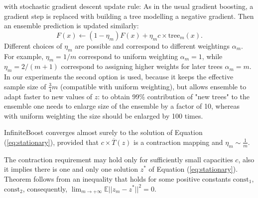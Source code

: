 with stochastic gradient descent update rule:
As in the usual gradient boosting, a gradient step is replaced with building a tree modelling a negative gradient.
Then an ensemble prediction is updated similarly:
\begin{equation*}
    F(x) \leftarrow (1 - \eta_m) F(x) + \eta_m c \times \text{tree}_m(x).
\end{equation*}
Different choices of $\eta_m$ are possible and correspond to different weightings $\alpha_m$.
For example, $\eta_m = 1 / m$ correspond to uniform weighting $\alpha_m = 1$,
while $\eta_m = 2 / (m + 1)$ correspond to assigning higher weights for later trees $\alpha_m = m$.
In our experiments the second option is used, because it keeps the effective sample size of $\frac{3}{4}m$ (compatible with uniform weighting),
but allows ensemble to adapt faster to new values of $z$:
to obtain 99\% contribution of "new trees" to the ensemble one needs to enlarge size of the ensemble by a factor of 10,
whereas with uniform weighting the size should be enlarged by 100 times.



\begin{theorem}
InfiniteBoost converges almost surely to the solution of Equation (\ref{eq:stationary}),
provided that $c \times \overline{T}(z)$ is a contraction mapping and
$\eta_m \sim \frac{1}{m}$.
\end{theorem}

The contraction requirement may hold only for sufficiently small capacities $c$,
also it implies there is one and only one solution $z^{*}$ of Equation (\ref{eq:stationary}).
Theorem follows from an inequality
that holds for some positive constants $\text{const}_1$, $\text{const}_2$,
consequently, $\lim_{m \to +\infty} \mathbb{E} || z_{m} - z^{*} ||^2 = 0$.


